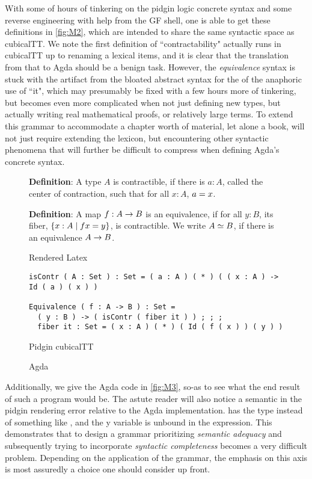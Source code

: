 With some of hours of tinkering on the pidgin logic concrete syntax and some
reverse engineering with help from the GF shell, one is able to get these
definitions in \autoref{fig:M2}, which are intended to share the same syntactic
space as cubicalTT. We note the first definition of ``contractability" actually
runs in cubicalTT up to renaming a lexical items, and it is clear that the
translation from that to Agda should be a benign task. However, the
\emph{equivalence} syntax is stuck with the artifact from the bloated abstract
syntax for the of the anaphoric use of ``it", which may presumably be fixed with
a few hours more of tinkering, but becomes even more complicated when not just
defining new types, but actually writing real mathematical proofs, or relatively
large terms. To extend this grammar to accommodate a chapter worth of material,
let alone a book, will not just require extending the lexicon, but encountering
other syntactic phenomena that will further be difficult to compress when
defining Agda's concrete syntax.

\begin{figure}

 \textbf{Definition}:
 A type $A$ is contractible, if there is $a : A$, called the center of contraction, such that for all $x : A$, $a = x$.

 \textbf{Definition}:
 A map $f : A \rightarrow B$ is an equivalence, if for all $y : B$, its fiber, $\{ x : A \mid f x = y \}$, is contractible.
 We write $A \simeq B$, if there is an equivalence $A \rightarrow B$.
\caption{Rendered Latex} \label{fig:M1}


\begin{verbatim}
isContr ( A : Set ) : Set = ( a : A ) ( * ) ( ( x : A ) -> Id ( a ) ( x ) )

Equivalence ( f : A -> B ) : Set = 
  ( y : B ) -> ( isContr ( fiber it ) ) ; ; ; 
  fiber it : Set = ( x : A ) ( * ) ( Id ( f ( x ) ) ( y ) )
\end{verbatim}
\caption{Pidgin cubicalTT} \label{fig:M2}


% 

\caption{Agda} \label{fig:M3}
\end{figure}

Additionally, we give the Agda code in \autoref{fig:M3}, so-as to see what the
end result of such a program would be. The astute reader will also notice a
semantic in the pidgin rendering error relative to the Agda implementation.
 has the type  instead of something like
, and the y variable is unbound in the 
expression. This demonstrates that to design a grammar prioritizing
\emph{semantic adequacy} and subsequently trying to incorporate \emph{syntactic
completeness} becomes a very difficult problem. Depending on the application of
the grammar, the emphasis on this axis is most assuredly a choice one should
consider up front.

